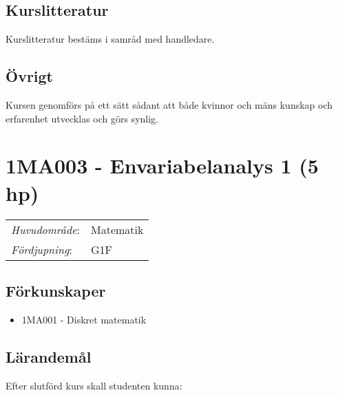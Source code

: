 \subsection*{Kurslitteratur}

Kurslitteratur bestäms i samråd med handledare.

\subsection*{Övrigt}

Kursen genomförs på ett sätt sådant att både kvinnor och mäns kunskap och erfarenhet utvecklas och görs synlig.
\pagebreak

\section*{1MA003 - Envariabelanalys 1 (5 hp)}

\begin{tabular}{ll}\emph{Huvudområde}: & Matematik\tabularnewline\emph{Fördjupning}: & G1F\tabularnewline\end{tabular}

\subsection*{Förkunskaper}

\begin{itemize}
\tightlist
\item
  1MA001 - Diskret matematik
\end{itemize}

\subsection*{Lärandemål}

Efter slutförd kurs skall studenten kunna:

